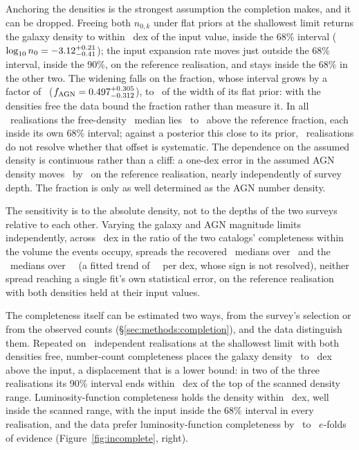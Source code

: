Anchoring the densities is the strongest assumption the completion makes,
and it can be dropped. Freeing both $n_{0,k}$ under flat priors at the
shallowest limit returns the galaxy density to within
\GalDensityFreeOffsetDex~dex of the input value, inside the 68\% interval
($\log_{10} n_0 = -3.12^{+0.21}_{-0.41}$); the input expansion rate moves just
outside the 68\% interval, inside the 90\%, on the reference realisation,
and stays inside the 68\% in the other two. The widening falls on
the fraction, whose interval grows by a factor of \FagnFreeWidthRatio\
($f_{\rm AGN} = 0.497^{+0.305}_{-0.312}$), to \FagnFreeWidthOfPrior\ of the width of its flat
prior: with the densities free the data bound the fraction rather than
measure it. In all \NSeedsIncomplete\ realisations the free-density \fagn\
median lies \FagnFreeOffsetMin\ to \FagnFreeOffsetMax\ above the reference
fraction, each inside its own 68\% interval; against a posterior this close
to its prior, \NSeedsIncomplete\ realisations do not
resolve whether that offset is systematic. The dependence on the assumed
density is continuous rather than a cliff: a one-dex error in the assumed
AGN density moves \fagn\ by \FagnDensitySlope\ on the reference realisation,
nearly independently of survey depth. The fraction
is only as well determined as the AGN number density.

The sensitivity is to the absolute density, not to the depths of the two
surveys relative to each other. Varying the galaxy and AGN magnitude limits
independently, across \RelCompletenessSpanDex~dex in the ratio of the two
catalogs' completeness within the volume the events occupy, spreads the
recovered \fagn\ medians over \FagnRelSpan\ and the \Hz\ medians over
\HzeroRelSpan~\kmsmpc\ (a fitted
trend of \HzeroRelSlope~\kmsmpc\ per dex, whose sign is not resolved),
neither spread reaching a single fit's own statistical error, on the
reference realisation with both densities held at their input values.

The completeness itself can be estimated two ways, from the survey's
selection or from the observed counts (\S\ref{sec:methods:completion}), and
the data distinguish them. Repeated on \NSeedsIncomplete\ independent
realisations at the shallowest limit with both densities free,
number-count completeness places the galaxy density \PixelAnchorBiasMinDex\
to \PixelAnchorBiasMaxDex~dex above the input, a displacement that is a
lower bound: in two of the three realisations its 90\% interval ends within
\PixelAnchorEdgeGapMaxDex~dex of the top of the scanned density range.
Luminosity-function completeness holds the density within
\GalAnchorOffsetMaxDex~dex, well inside the scanned range, with the input
inside the 68\% interval in every realisation, and the data prefer
luminosity-function completeness by \SeedLnBFmin\ to \SeedLnBFmax\
$e$-folds of evidence (Figure~\ref{fig:incomplete}, right).

